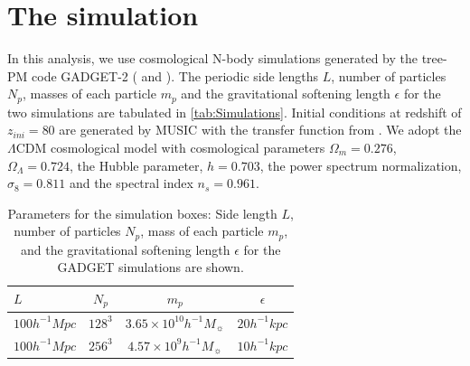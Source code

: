 \documentclass[fleqn,usenatbib,useAMS]{mnras}
\begin{document}

\section{The simulation}
\label{sec:simulation}

In this analysis, we use cosmological N-body simulations generated by the tree-PM code {GADGET-2}    (\citealt{Springel2005} and \citealt{Springel2001}). 
The periodic side lengths $L$, number of particles $N_p$, masses of each particle $m_p$ and the gravitational softening length $\epsilon$ for the two simulations are tabulated in \autoref{tab:Simulations}. Initial conditions at redshift of $z_{ini}= 80$ are generated by {MUSIC} \citep{Hahn2011a} with the transfer function from \cite{Eisenstein1998a}. We adopt the $\Lambda$CDM cosmological model with cosmological parameters $\Omega_{m}= 0.276$, $\Omega_{\Lambda}= 0.724$, the Hubble parameter, $h = 0.703$, the power spectrum normalization, $\sigma_8 = 0.811$ and the spectral index $n_s= 0.961$. 

\begin{table}
  \caption{Parameters for the simulation boxes: Side length $L$, number of particles $N_p$, mass of each particle $m_p$, and the gravitational softening length $\epsilon$ for the GADGET simulations are shown.}
\begin{tabular}{l|c|c|c| }
\hline
$L$ & $N_p$ & $m_p$ & $\epsilon$  \\  \hline
$100 h^{-1} Mpc$ & $128^3$      & $ 3.65 \times 10^{10} h^{-1} M_{\sun}$  & $20 h^{-1} kpc$\\ \hline
$100 h^{-1} Mpc$ & $256^3$      & $ 4.57 \times 10^{9} h^{-1} M_{\sun}$  & $10 h^{-1} kpc$ \\ \hline

\end{tabular}
\label{tab:Simulations}
\end{table}

\end{document}
